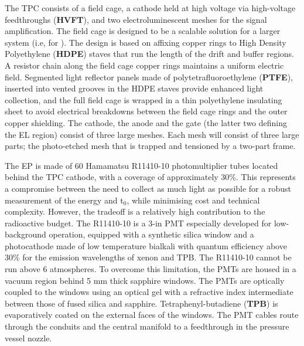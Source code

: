 The TPC consists of a field cage, a cathode held at high voltage via high-voltage feedthroughs ({\bf HVFT}), and two electroluminescent meshes for the signal amplification.
The field cage is designed to be a scalable solution for a larger system (i.e, for \NHD).  The design is based on affixing copper rings to High Density Polyethylene ({\bf HDPE}) staves that run the length of the drift and buffer regions.  
A resistor chain along the field cage copper rings maintains a uniform electric field. Segmented light reflector panels made of polytetrafluoroethylene ({\bf PTFE}),  inserted into vented grooves in the HDPE staves provide enhanced light collection, and the full field cage is wrapped in a thin polyethylene insulating sheet to avoid electrical breakdowns between the field cage rings and the outer copper shielding.
The cathode, the anode and the gate (the latter two defining the EL region) consist of three large meshes.  Each mesh will consist of three large parts; the photo-etched mesh that is trapped and tensioned by a two-part frame. 


The EP is made of 60 Hamamatsu R11410-10 photomultiplier tubes located behind the TPC cathode, with a coverage of approximately 30\%. This represents a compromise between the need to collect as much light as possible for a robust measurement of the energy and t$_0$, while minimising cost and technical complexity. However, the tradeoff is a relatively high contribution to the radioactive budget. The R11410-10 is a 3-in PMT especially developed for low-background operation, equipped with a synthetic silica window and a photocathode made of low temperature bialkali with quantum efficiency above 30\% for the emission wavelengths of xenon and TPB.
The R11410-10 cannot be run above 6 atmospheres. To overcome this limitation, the PMTs are housed in a vacuum region behind 5 mm thick sapphire windows. %
The PMTs are optically coupled to the windows using an optical gel with a refractive index intermediate between those of fused silica and sapphire. Tetraphenyl-butadiene ({\bf TPB}) is evaporatively coated on the external faces of the windows. 
The PMT cables route through the conduits and the central manifold to a feedthrough in the pressure vessel nozzle.  


